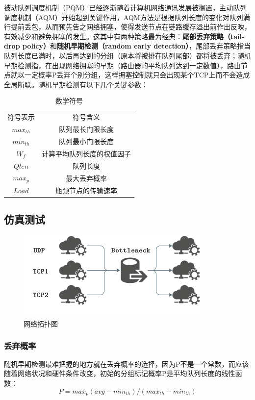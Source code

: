 \documentclass{article}
\begin{document}
被动队列调度机制（PQM）已经逐渐随着计算机网络通讯发展被搁置，主动队列调度机制（AQM）开始起到关键作用，AQM方法是根据队列长度的变化对队列满行提前丢包，从而预先告之网络拥塞，使得发送节点在链路缓存溢出前作出反映，有效减少和避免拥塞的发生。这其中有两种策略最为经典：\textbf{尾部丢弃策略（tail-drop policy）}和\textbf{随机早期检测（random early detection）}，尾部丢弃策略指当队列长度已满时，以后再达到的分组（原本将被排在队列尾部）都将被丢弃；随机早期检测指，在出现网络拥塞的早期（路由器的平均队列达到一定数值），路由节点就以一定概率P丢弃个别分组，这样拥塞控制就只会出现某个TCP上而不会造成全局断联。随机早期检测有以下几个关键参数：

\begin{table}[H]
	\centering
	\caption{数学符号}
	\label{table}
	\begin{tabular}{cc}
		\hline
		符号表示&符号含义\\
		$max_{th}$ & 队列最长门限长度\\
		$min_{th}$ & 队列最小门限长度\\
		$W_f$ & 计算平均队列长度的权值因子\\
		$Qlen$ & 队列长度\\
		$max_p$ & 最大丢弃概率\\
		$Load$ & 瓶颈节点的传输速率\\
		\hline
	\end{tabular}
\end{table}

\subsection{仿真测试}

\begin{figure}[H]
	\centering
	\includegraphics[scale=0.6]{picture/topology1.png}
	\caption{网络拓扑图}
	\label{fig:topology1}
\end{figure}

\subsubsection{丢弃概率}
随机早期检测最难把握的地方就在丢弃概率的选择，因为P不是一个常数，而应该随着网络状况和硬件条件改变，初始的分组标记概率P是平均队列长度的线性函数：
\begin{equation*}
	P=max_p(avg-min_{th})/(max_{th}-min_{th})
\end{equation*}
\end{document}
